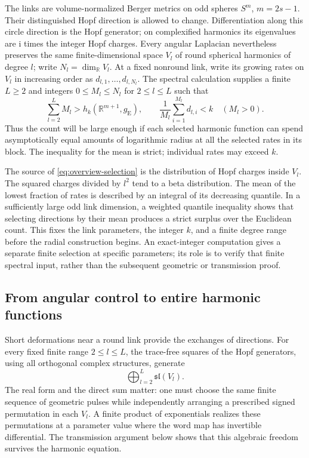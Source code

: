 The links are volume-normalized Berger metrics on odd spheres
$S^m$, $m=2s-1$. Their distinguished Hopf direction is allowed to change.
Differentiation along this circle direction is the Hopf generator; on
complexified harmonics its eigenvalues are \(\mathrm i\) times the
integer Hopf charges. Every angular Laplacian nevertheless preserves the same finite-dimensional
space $V_l$ of round spherical harmonics of degree $l$; write
$N_l=\dim_{\mathbb R}V_l$. At a fixed nonround link, write its growing rates
on $V_l$ in increasing order as $d_{l,1},\ldots,d_{l,N_l}$. The spectral
calculation supplies a finite $L\geq2$ and integers $0\leq M_l\leq N_l$
for $2\leq l\leq L$ such that
\begin{equation}\label{eq:overview-selection}
 \sum_{l=2}^L M_l>h_k(\mathbb R^{m+1},g_{\mathrm E}),
 \qquad
 \frac1{M_l}\sum_{i=1}^{M_l}d_{l,i}<k\quad(M_l>0).
\end{equation}
Thus the count will be large enough if each selected harmonic function can
spend asymptotically equal amounts of logarithmic radius at all the selected
rates in its block. The inequality for the mean is strict; individual rates
may exceed $k$.

The source of \eqref{eq:overview-selection} is the distribution of Hopf
charges inside $V_l$. The squared charges divided by $l^2$ tend to a
beta distribution. The mean of the lowest fraction of rates is described by
an integral of its decreasing quantile. In a sufficiently large odd link
dimension, a weighted quantile inequality shows that selecting directions by
their mean produces a strict surplus over the Euclidean count. This fixes the
link parameters, the integer $k$, and a finite degree range before the
radial construction begins. An exact-integer computation gives a separate
finite selection at specific parameters; its role is to verify that finite
spectral input, rather than the subsequent geometric or transmission proof.

\subsection*{From angular control to entire harmonic functions}

Short deformations near a round link provide the exchanges of directions.
For every fixed finite range $2\leq l\leq L$, the trace-free squares of
the Hopf generators, using all orthogonal complex structures, generate
\[
 \bigoplus_{l=2}^L\mathfrak{sl}(V_l).
\]
The real form and the direct sum matter: one must choose the same finite
sequence of geometric pulses while independently arranging a prescribed
signed permutation in each $V_l$. A finite product of exponentials realizes
these permutations at a parameter value where the word map has invertible
differential. The transmission argument below shows that this algebraic
freedom survives the harmonic equation.

